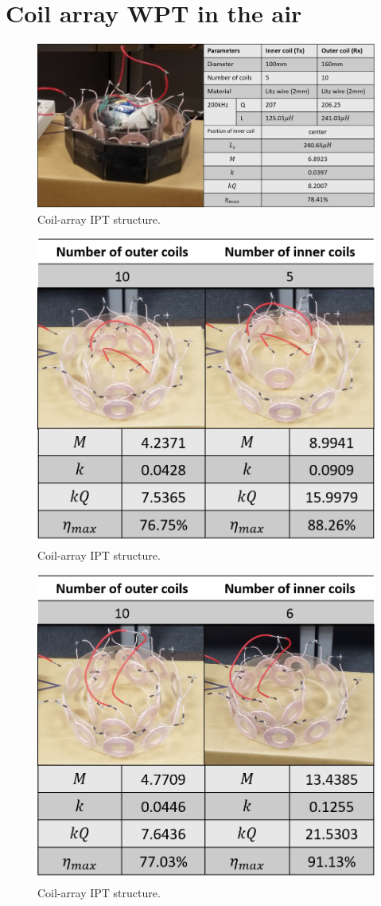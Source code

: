 \section{Coil array WPT in the air}
\begin{figure}[htbp]
    \centering
    \includegraphics[width=1.0\linewidth]{images/4_coil_5_10_with_ferrite.png}
    \caption{Coil-array IPT structure.}
\end{figure}
\begin{figure}[htbp]
    \centering
    \includegraphics[width=0.6\linewidth]{images/4_coil_5_10_without_ferrite.png}
    \caption{Coil-array IPT structure.}
\end{figure}
\begin{figure}[htbp]
    \centering
    \includegraphics[width=0.6\linewidth]{images/4_coil_6_10_without_ferrite.png}
    \caption{Coil-array IPT structure.}
\end{figure}

